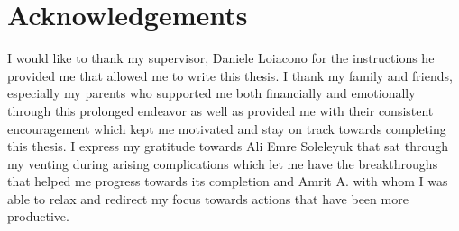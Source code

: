 \documentclass{Configuration_Files/PoliMi3i_thesis}
\begin{document}
\listoffigures

\listoftables


\chapter*{Acknowledgements}
I would like to thank my supervisor, Daniele Loiacono for the instructions he provided me that allowed me to write this thesis.
I thank my family and friends, especially my parents who supported me both financially and emotionally through this prolonged endeavor as well as provided me with their consistent encouragement which kept me motivated and stay on track towards completing this thesis. I express my gratitude towards Ali Emre Soleleyuk that sat through my venting during arising complications which let me have the breakthroughs that helped me progress towards its completion and Amrit A. with whom I was able to relax and redirect my focus towards actions that have been more productive.

\cleardoublepage
\end{document}

